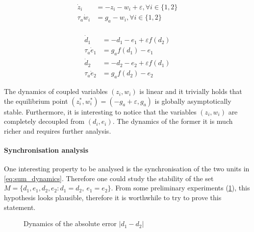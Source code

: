\begin{equation} 
\begin{aligned}
\dot z_i &= - z_i - w_i + \varepsilon, \forall i \in \{1,2\} \\
\tau_a \dot w_i &= g_a - w_i , \forall i \in \{1,2\} \\
\end{aligned}
\label{eq:diff_dynamics}
\end{equation}


\begin{equation} 
\begin{aligned}
\dot d_{1} &= - d_1 - e_1 + \varepsilon f(d_2) \\
\tau_a \dot{e}_{1} &= g_a f(d_1) - e_{1} \\
\dot d_{2} &= - d_2 - e_2 + \varepsilon f(d_1) \\
\tau_a \dot{e}_{2} &= g_a f(d_2) - e_{2} 
\end{aligned}
\label{eq:sum_dynamics}
\end{equation}


The dynamics of coupled variables $(z_i, w_i)$ is linear and it trivially holds that the equilibrium point $(z_i^*,w_i^*)=(-g_a+\varepsilon, g_a)$ is globally asymptotically stable. Furthermore, it is interesting to notice that the variables  $(z_i, w_i)$ are completely decoupled from $(d_i, e_i)$. The dynamics of the former it is much richer and requires further analysis. 
\paragraph{Synchronisation analysis}
One interesting property to be analysed is the synchronisation of the two units in \eqref{eq:sum_dynamics}. Therefore one could study the stability of the set $M = \{d_1, e_1, d_2, e_2 : d_1 = d_2,\ e_1 = e_2 \}$. From some preliminary experiments (\cref{fig:2_2_synch}), this hypothesis looks plausible, therefore it is worthwhile to try to prove this statement.

 \begin{figure}[!h]
        \caption{\label{fig:2_2_synch} Dynamics of the absolute error $|d_1-d_2|$}
\end{figure}

